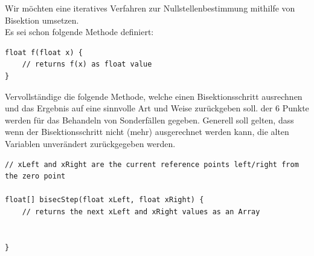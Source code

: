 \documentclass{scrartcl}
\begin{document}

Wir möchten eine iteratives Verfahren zur Nullstellenbestimmung mithilfe von Bisektion umsetzen. \\
Es sei schon folgende Methode definiert:
\begin{lstlisting}
float f(float x) {
	// returns f(x) as float value
}
\end{lstlisting}
\lbreak
Vervollständige die folgende Methode, welche einen Bisektionsschritt ausrechnen und das Ergebnis auf eine sinnvolle Art und Weise zurückgeben soll.  der 6 Punkte werden für das Behandeln von Sonderfällen gegeben. Generell soll gelten, dass wenn der Bisektionsschritt nicht (mehr) ausgerechnet werden kann, die alten Variablen unverändert zurückgegeben werden.
\n 
\begin{lstlisting}
// xLeft and xRight are the current reference points left/right from the zero point

float[] bisecStep(float xLeft, float xRight) {
	// returns the next xLeft and xRight values as an Array
	
	
}
\end{lstlisting}
\end{document}
